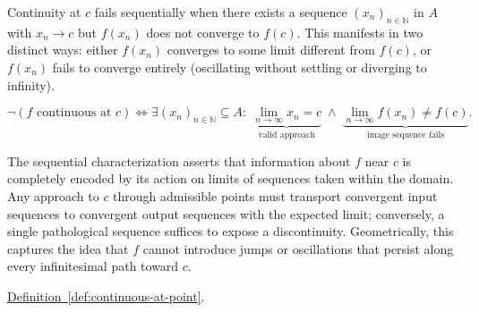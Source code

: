 \begin{remark*}
Continuity at $c$ fails sequentially when there exists a sequence $(x_n)_{n\in\mathbb{N}}$ in $A$ with $x_n \to c$ but $f(x_n)$ does not converge to $f(c)$. This manifests in two distinct ways: either $f(x_n)$ converges to some limit different from $f(c)$, or $f(x_n)$ fails to converge entirely (oscillating without settling or diverging to infinity).
\end{remark*}

\begin{remark*}
\[
\neg(\text{$f$ continuous at $c$}) \Longleftrightarrow
\exists (x_n)_{n\in\mathbb{N}} \subseteq A :\;
\underbrace{\lim_{n\to\infty} x_n = c}_{\text{valid approach}}
\;\land\;
\underbrace{\lim_{n\to\infty} f(x_n) \ne f(c)}_{\text{image sequence fails}}.
\]
\end{remark*}

\begin{remark*}[Interpretation]
The sequential characterization asserts that information about $f$ near $c$ is completely encoded by its action on limits of sequences taken within the domain. Any approach to $c$ through admissible points must transport convergent input sequences to convergent output sequences with the expected limit; conversely, a single pathological sequence suffices to expose a discontinuity. Geometrically, this captures the idea that $f$ cannot introduce jumps or oscillations that persist along every infinitesimal path toward $c$.
\end{remark*}

\begin{dependencies}
\hyperref[def:continuous-at-point]{Definition~\ref*{def:continuous-at-point}}.
\end{dependencies}

